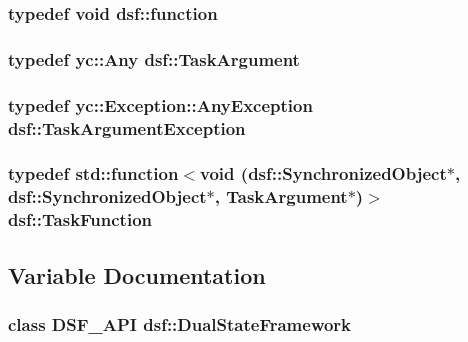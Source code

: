 \subsubsection[{function}]{\setlength{\rightskip}{0pt plus 5cm}typedef void {\bf dsf\+::function}}\label{namespacedsf_a3ad20407a44eaf5ce4cf784a60c1b92b}
\hypertarget{namespacedsf_abe4bf68433935a81c31a5ada9b17663a}{}
\subsubsection[{Task\+Argument}]{\setlength{\rightskip}{0pt plus 5cm}typedef yc\+::\+Any {\bf dsf\+::\+Task\+Argument}}\label{namespacedsf_abe4bf68433935a81c31a5ada9b17663a}
\hypertarget{namespacedsf_af54027177bbfc0037be408a612d48b83}{}
\subsubsection[{Task\+Argument\+Exception}]{\setlength{\rightskip}{0pt plus 5cm}typedef yc\+::\+Exception\+::\+Any\+Exception {\bf dsf\+::\+Task\+Argument\+Exception}}\label{namespacedsf_af54027177bbfc0037be408a612d48b83}
\hypertarget{namespacedsf_aa16e735f29587f4485b56fc46746f7a9}{}
\subsubsection[{Task\+Function}]{\setlength{\rightskip}{0pt plus 5cm}typedef std\+::function$<$void ({\bf dsf\+::\+Synchronized\+Object}$\ast$, {\bf dsf\+::\+Synchronized\+Object}$\ast$, {\bf Task\+Argument}$\ast$)$>$ {\bf dsf\+::\+Task\+Function}}\label{namespacedsf_aa16e735f29587f4485b56fc46746f7a9}


\subsection{Variable Documentation}
\hypertarget{namespacedsf_a68ac3b6a0526bfa7f6a412918afb1841}{}
\subsubsection[{Dual\+State\+Framework}]{\setlength{\rightskip}{0pt plus 5cm}class {\bf D\+S\+F\+\_\+\+A\+P\+I} {\bf dsf\+::\+Dual\+State\+Framework}}\label{namespacedsf_a68ac3b6a0526bfa7f6a412918afb1841}
\hypertarget{namespacedsf_acbf1798fc56cfb1707162a17e13f5fda}{}
